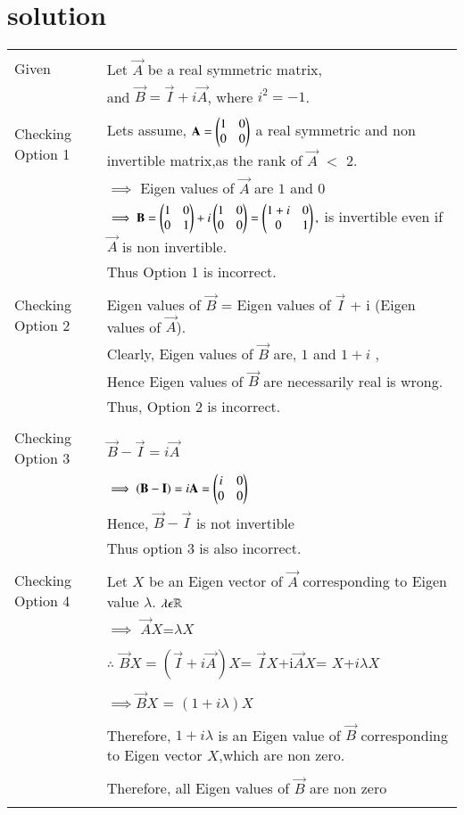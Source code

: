 \documentclass[journal,12pt,twocolumn]{IEEEtran}
\begin{document}
\section{\textbf{solution}}
\begin{table}[h!]
\begin{center}
\begin{tabular}{|p{5cm}|p{10cm}|}
\hline
& \\
Given &Let $\vec{A}$ be a real symmetric matrix,
\\& and $\vec{B}=\vec{I}+i\vec{A}$, where $i^2=-1$.\\
\hline
&\\
Checking Option 1
& Lets assume, $\mathbf{A}=\begin{pmatrix}1 & 0\\ 0 & 0\end{pmatrix}$ a real symmetric and non invertible matrix,as the rank of $\vec{A}$ $<$ $2.$\\& $\implies$ Eigen values of $\vec{A}$ are $1$ and $0$ \\&$\implies\mathbf{B}=\begin{pmatrix}1 & 0\\ 0 & 1\end{pmatrix}+i\begin{pmatrix}1 & 0\\ 0 & 0\end{pmatrix}=\begin{pmatrix}1+i & 0\\ 0 & 1  \end{pmatrix},$ is invertible even if $\vec{A}$ is non invertible.\\&Thus Option 1 is incorrect.  \\
\hline
&\\
Checking Option 2 
& Eigen values of $\vec{B}$ = Eigen values of  $\vec{I}$ + i (Eigen values of $\vec{A}$).\\& Clearly, Eigen values of $\vec{B}$ are, $1$ and $1+i$  ,\\& Hence Eigen values of $\vec{B}$ are necessarily real is wrong.\\&
Thus, Option 2 is incorrect.\\
\hline
 &\\
Checking Option 3
& $\vec{B}-\vec{I}=i\vec{A}$\\
&$\implies \mathbf{(B-I)}=i\mathbf{A}=\begin{pmatrix}i & 0\\ 0 & 0\end{pmatrix}$\\
& Hence, $\vec{B}-\vec{I}$ is not invertible \\& Thus option 3 is also incorrect.\\
\hline
& \\
Checking Option 4 & Let $X$ be an Eigen vector of $\vec{A}$ corresponding to Eigen value $\lambda$. $\lambda\epsilon \mathbb{R}$\\
& $\implies$ $\vec{A}$$X$=$\lambda X $ \\
&\\
& $\therefore$ $\vec{B}$$X=(\vec{I}+i\vec{A})X$= $\vec{I}$$X$+i$\vec{A}$$X$= $X$+$i\lambda$$X$\\
&\\
& $\implies$$\vec{B}$$X$ = $(1+i\lambda)$$X$\\
&\\
& Therefore, $1+i\lambda$ is an Eigen value of $\vec{B}$ corresponding to Eigen vector $X$,which are non zero.\\
&\\
& Therefore, all Eigen values of $\vec{B}$ are non zero \\
&\\


\end{tabular}
\end{center}
\end{table}
\end{document}
